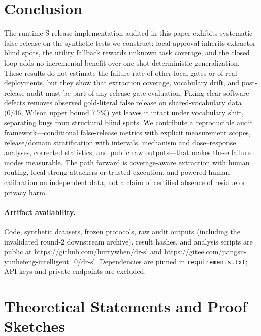 \documentclass[journal]{IEEEtran}
\begin{document}
\section{Conclusion}
The runtime-S release implementation audited in this paper exhibits systematic false release on the synthetic tests we construct: local approval inherits extractor blind spots, the utility fallback rewards unknown task coverage, and the closed loop adds no incremental benefit over one-shot deterministic generalization. These results do not estimate the failure rate of other local gates or of real deployments, but they show that extraction coverage, vocabulary drift, and post-release audit must be part of any release-gate evaluation. Fixing clear software defects removes observed gold-literal false release on shared-vocabulary data (0/46, Wilson upper bound 7.7\%) yet leaves it intact under vocabulary shift, separating bugs from structural blind spots. We contribute a reproducible audit framework---conditional false-release metrics with explicit measurement scopes, release/domain stratification with intervals, mechanism and dose--response analyses, corrected statistics, and public raw outputs---that makes these failure modes measurable. The path forward is coverage-aware extraction with human routing, local strong attackers or trusted execution, and powered human calibration on independent data, not a claim of certified absence of residue or privacy harm.

\paragraph{Artifact availability.} Code, synthetic datasets, frozen protocols, raw audit outputs (including the invalidated round-2 downstream archive), result hashes, and analysis scripts are public at \url{https://github.com/hurrywhen/dr-sl} and \url{https://gitee.com/jiangsu-yunhefeng-intelligent_0/dr-sl}. Dependencies are pinned in \texttt{requirements.txt}; API keys and private endpoints are excluded.

\appendices

\section{Theoretical Statements and Proof Sketches}\label{sec:theory}
\end{document}
